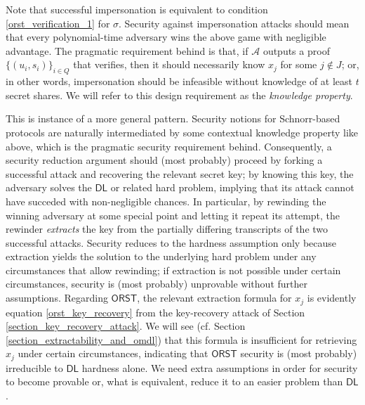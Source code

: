 \documentclass{iacrtrans}
\begin{document}
\noindent
Note that successful impersonation is equivalent
to condition \eqref{orst_verification_1} for $\sigma$.
Security against impersonation attacks should mean
that every polynomial-time adversary wins the above game
with negligible advantage.
The pragmatic requirement behind is that,
if $\mathcal{A}$ outputs a proof
$\{(u_i, s_i)\}_{i \in Q}$ that verifies,
then it should necessarily know $x_j$ for some $j \not \in J$;
or, in other words,
impersonation should be infeasible
without knowledge of at least $t$ secret shares.
We will refer to this design requirement
as the \textit{knowledge property}.

This is instance of a more general pattern.
Security notions for Schnorr-based protocols
are naturally intermediated by some
contextual knowledge property like above,
which is the pragmatic security requirement behind.
Consequently,
a security reduction argument should (most probably)
proceed by forking a successful attack and recovering
the relevant secret key;
by knowing this key, the adversary solves
the $\mathsf{DL}$ or related hard problem,
implying that its attack cannot have succeded
with non-negligible chances.
In particular, by rewinding the winning adversary
at some special point and letting it repeat its attempt,
the rewinder \textit{extracts} the key
from the partially differing transcripts
of the two successful attacks.
Security reduces to the hardness assumption only because
extraction yields the solution to the underlying hard problem
under any circumstances that allow rewinding;
if extraction is not possible under certain circumstances,
security is (most probably)
unprovable without further assumptions.
Regarding $\mathsf{ORST}$,
the relevant extraction formula for $x_j$
is evidently equation \eqref{orst_key_recovery}
from the key-recovery attack
of Section \ref{section_key_recovery_attack}.
We will see
(cf. Section \ref{section_extractability_and_omdl})
that this formula is insufficient for retrieving $x_j$
under certain circumstances,
indicating that $\mathsf{ORST}$ security
is (most probably) irreducible
to $\mathsf{DL}$ hardness alone.
We need extra assumptions in order
for security to become provable
or, what is equivalent,
reduce it to an easier problem than $\mathsf{DL}$.
\end{document}
